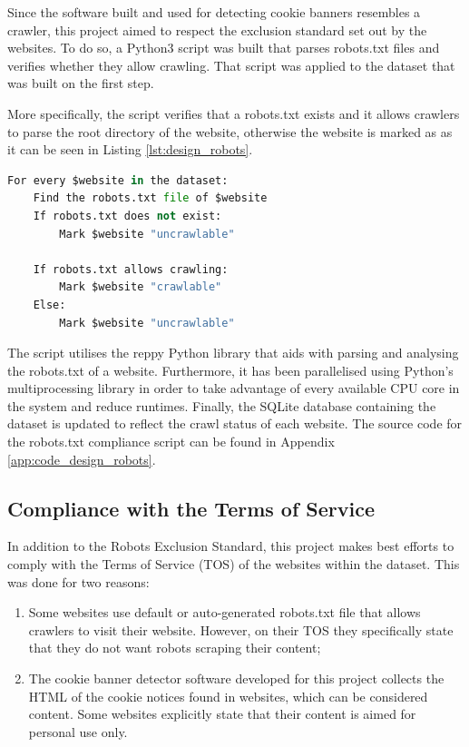 \documentclass[../main.tex]{subfiles}
\begin{document}
Since the software built and used for detecting cookie banners resembles a crawler, this project aimed to respect the exclusion standard set out by the websites. To do so, a Python3 script was built that parses robots.txt files and verifies whether they allow crawling. That script was applied to the dataset that was built on the first step.

More specifically, the script verifies that a robots.txt exists and it allows crawlers to parse the root directory of the website, otherwise the website is marked as  as it can be seen in Listing \ref{lst:design_robots}.

\begin{lstlisting}[language=Python, caption=Pseudocode of the algorithm followed by the robots.txt parser script., label=lst:design_robots,captionpos=b, style=lst_style]
For every $website in the dataset:
    Find the robots.txt file of $website
    If robots.txt does not exist:
        Mark $website "uncrawlable"
    
    If robots.txt allows crawling:
        Mark $website "crawlable"
    Else:
        Mark $website "uncrawlable"
\end{lstlisting}

The script utilises the reppy Python library \cite{reppy} that aids with parsing and analysing the robots.txt of a website. Furthermore, it has been parallelised using Python’s multiprocessing library in order to take advantage of every available CPU core in the system and reduce runtimes. Finally, the SQLite database containing the dataset is updated to reflect the crawl status of each website. The source code for the robots.txt compliance script can be found in Appendix \ref{app:code_design_robots}.

\subsection{Compliance with the Terms of Service}
In addition to the Robots Exclusion Standard, this project makes best efforts to comply with the Terms of Service (TOS) of the websites within the dataset. This was done for two reasons:

\begin{enumerate}
    \item Some websites use default or auto-generated robots.txt file that allows crawlers to visit their website. However, on their TOS they specifically state that they do not want robots scraping their content;
    
    \item The cookie banner detector software developed for this project collects the HTML of the cookie notices found in websites, which can be considered content. Some websites explicitly state that their content is aimed for personal use only. 
\end{enumerate}
\end{document}
